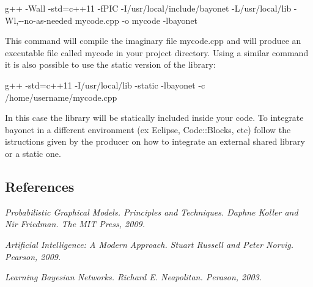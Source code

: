 {\ttfamily g++ -\/\-Wall -\/std=c++11 -\/f\-P\-I\-C -\/\-I/usr/local/include/bayonet -\/\-L/usr/local/lib -\/\-Wl,-\/-\/no-\/as-\/needed mycode.\-cpp -\/o mycode -\/lbayonet}

This command will compile the imaginary file mycode.\-cpp and will produce an executable file called mycode in your project directory. Using a similar command it is also possible to use the static version of the library\-:

{\ttfamily g++ -\/std=c++11 -\/\-I/usr/local/lib -\/static -\/lbayonet -\/c /home/username/mycode.cpp}

In this case the library will be statically included inside your code. To integrate bayonet in a different environment (ex Eclipse, Code\-::\-Blocks, etc) follow the istructions given by the producer on how to integrate an external shared library or a static one.

\subsection*{References }


\begin{DoxyItemize}
\item {\itshape Probabilistic Graphical Models. Principles and Techniques. Daphne Koller and Nir Friedman. The M\-I\-T Press, 2009.}
\item {\itshape Artificial Intelligence\-: A Modern Approach. Stuart Russell and Peter Norvig. Pearson, 2009.}
\item {\itshape Learning Bayesian Networks. Richard E. Neapolitan. Perason, 2003.} 
\end{DoxyItemize}